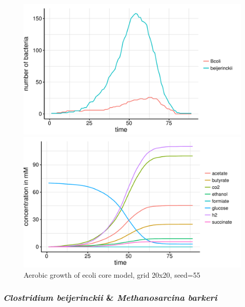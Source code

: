 \begin{figure}[h]

  \centering
  \begin{minipage}[t]{0.45\textwidth}
    \includegraphics[width=\textwidth]{../results/ecoli_beijerinckii_20x20_seed5147_growth.pdf}
  \end{minipage}
  \begin{minipage}[t]{0.45\textwidth}
    \includegraphics[width=\textwidth]{../results/ecoli_beijerinckii_20x20_seed5147_subs.pdf}
  \end{minipage}
  \caption{Aerobic growth of ecoli core model, grid 20x20, seed=55}
\end{figure}
\subsubsection{\textit{Clostridium beijerinckii} \& \textit{Methanosarcina barkeri}}

